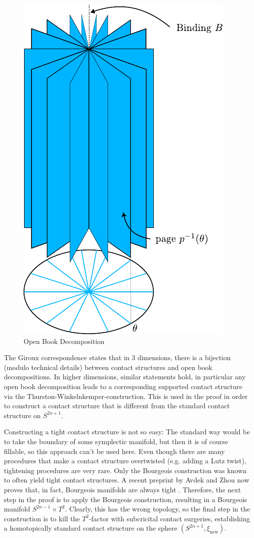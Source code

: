 \begin{figure}
    \includegraphics{../images/open_book.pdf}
    \caption{Open Book Decomposition}
    \label{fig:open_book}
\end{figure}

The Giroux correspondence states that in 3 dimensions, there is a bijection (modulo technical details) between contact structures
and open book decompositions.
In higher dimensions, similar statements hold, in particular any open book decomposition leads to a corresponding supported
contact structure via the Thurston-Winkelnkemper-construction.
This is used in the proof in order to construct a contact structure that is different from the standard contact structure on $S^{2n+1}$.

Constructing a tight contact structure is not so easy: The standard way would be to take the boundary of some symplectic manifold,
but then it is of course fillable, so this approach can't be used here.
Even though there are many procedures that make a contact structure overtwisted (e.g. adding a Lutz twist), tightening procedures are very rare.
Only the Bourgeois construction was known to often yield tight contact structures. 
A recent preprint by Avdek and Zhou now proves that, in fact, Bourgeois manifolds are always tight \cite{AZ24}.
Therefore, the next step in the proof is to apply the Bourgeois construction, resulting in a Bourgeois manifold $S^{2n-1} \times T^2$.
Clearly, this has the wrong topology, so the final step in the construction is to kill the $T^2$-factor with
subcricital contact surgeries, establishing a homotopically standard contact structure on the sphere $(S^{2n+1},\xi_\text{new})$.

